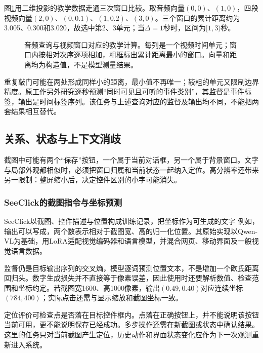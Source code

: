 图\ref{fig:vision-av-temporal-match}用二维投影的教学数据走通三次窗口比较。取音频向量$(0,0)$、$(1,0)$，四段视频向量$(2,0)$、$(0,0.1)$、$(1,0.2)$、$(3,0)$。三个窗口的累计距离约为3.005、0.300和3.020，故选中第2、3单元；当$\Delta=1$秒时，区间为$[1,3)$秒。

\begin{figure}[htbp]
  \centering
  
  \caption{音频查询与视频窗口对应的教学计算。每列是一个视频时间单元；窗口内按相对次序逐项相加，粗框标出累计距离最小的窗口。向量和距离均为构造值，不是模型测量结果。}
  \label{fig:vision-av-temporal-match}
\end{figure}
\FloatBarrier

重复敲门可能在两处形成同样小的距离，最小值不再唯一；较粗的单元又限制边界精度。原工作另外研究逐秒预测“同时可见且可听的事件类别”，其监督是事件标签，输出是时间标签序列。该任务与上述查询对应的监督及输出均不同，不能把两套结果相互替代。

\subsection{关系、状态与上下文消歧}
\label{sec:vision-understanding-context}

截图中可能有两个“保存”按钮，一个属于当前对话框，另一个属于背景窗口。文字与局部外观都相似时，必须把窗口归属和当前状态一起纳入定位。高分辨率还带来另一限制：整屏缩小后，决定控件区别的小字可能消失。

\Needspace{60mm}
\subsubsection{SeeClick的截图指令与坐标预测}
\label{sec:vision-understanding-seeclick}

SeeClick以截图、控件描述与位置构成训练记录，把坐标作为可生成的文字
例如，输出可以写成，两个数表示相对于截图宽、高的归一化位置。其原始实现以Qwen-VL为基础，用LoRA适配视觉编码器和语言模型，并混合网页、移动界面及一般视觉语言数据。

监督仍是目标输出序列的交叉熵，模型逐词预测位置文本，不是增加一个欧氏距离回归头。数字生成损失并不直接等于像素误差，因此使用时还要解析数值、检查范围和坐标约定。若截图宽1600、高1000像素，输出$(0.49,0.40)$对应连续坐标$(784,400)$；实际点击还需与显示缩放和截图坐标一致。

定位评价可检查点是否落在目标控件框内。点落在正确按钮上，并不能说明该按钮当前可用，更不能说明保存已经成功。多步操作还需在新截图或状态中确认结果。这里的任务只对当前截图产生定位，历史动作和界面状态变化应作为下一次观测重新进入系统。

